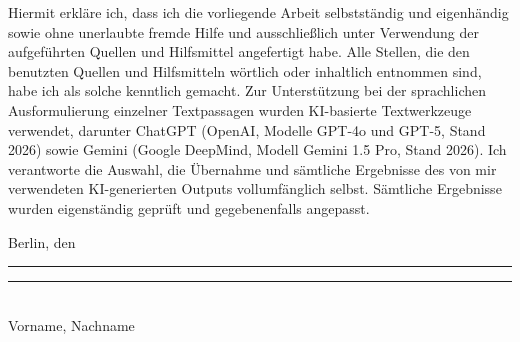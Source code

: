 \vspace*{4cm}  %

\noindent
Hiermit erkläre ich, dass ich die vorliegende Arbeit selbstständig und eigenhändig sowie ohne unerlaubte fremde Hilfe und ausschließlich unter Verwendung der aufgeführten Quellen und
Hilfsmittel angefertigt habe. Alle Stellen, die den benutzten Quellen und 
Hilfsmitteln wörtlich oder inhaltlich entnommen sind, habe ich als solche kenntlich gemacht.  
Zur Unterstützung bei der sprachlichen Ausformulierung einzelner Textpassagen wurden KI-basierte Textwerkzeuge verwendet, darunter ChatGPT (OpenAI, Modelle GPT-4o und GPT-5, Stand 2026) sowie Gemini (Google DeepMind, Modell Gemini 1.5 Pro, Stand 2026).
Ich verantworte die Auswahl, die Übernahme und sämtliche Ergebnisse des von mir verwendeten KI-generierten Outputs vollumfänglich selbst. Sämtliche Ergebnisse wurden eigenständig geprüft und gegebenenfalls angepasst.
\vspace{2cm}

\noindent
Berlin, den \rule{40mm}{0.4pt}

\vspace{2cm}

\noindent
\rule{60mm}{0.4pt} \\
Vorname, Nachname


\clearpage



